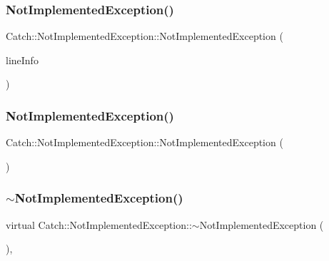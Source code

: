 \subsubsection{Not\+Implemented\+Exception()\hspace{0.1cm}{\footnotesize\ttfamily [1/2]}}
{\footnotesize\ttfamily Catch\+::\+Not\+Implemented\+Exception\+::\+Not\+Implemented\+Exception (\begin{DoxyParamCaption}\item[{\textbf{ Source\+Line\+Info} const \&}]{line\+Info }\end{DoxyParamCaption})}

\mbox{\label{class_catch_1_1_not_implemented_exception_a508a7a833455da2d3c10ea1a9d45e982}} 
\subsubsection{Not\+Implemented\+Exception()\hspace{0.1cm}{\footnotesize\ttfamily [2/2]}}
{\footnotesize\ttfamily Catch\+::\+Not\+Implemented\+Exception\+::\+Not\+Implemented\+Exception (\begin{DoxyParamCaption}\item[{\textbf{ Not\+Implemented\+Exception} const \&}]{ }\end{DoxyParamCaption})\hspace{0.3cm}{\ttfamily [inline]}}

\mbox{\label{class_catch_1_1_not_implemented_exception_a557e7312aaa32c37bded019f2b059bcb}} 
\subsubsection{$\sim$\+Not\+Implemented\+Exception()}
{\footnotesize\ttfamily virtual Catch\+::\+Not\+Implemented\+Exception\+::$\sim$\+Not\+Implemented\+Exception (\begin{DoxyParamCaption}{ }\end{DoxyParamCaption})\hspace{0.3cm}{\ttfamily [inline]}, {\ttfamily [virtual]}}



